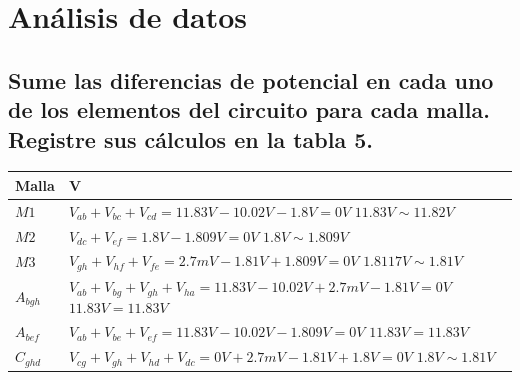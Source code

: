\documentclass[letterpaper, 12pt]{article}
\begin{document}
\section{Análisis de datos}

\subsection{Sume las diferencias de potencial en cada uno de los elementos del circuito para cada
	malla. Registre sus cálculos en la tabla 5.}

\begin{tabularx}{0.9\linewidth}{|>{\centering\arraybackslash}X|>{\centering\arraybackslash}X|}
	\hline

	\textbf{Malla} & \textbf{V}                                                                 \\ \hline
	$M1$           & $V_{ab} + V_{bc} + V_{cd} = 11.83V - 10.02V -1.8V = 0V$
	$11.83V \sim 11.82V$                                                                        \\ \hline

	$M2$           & $V_{dc} + V_{ef} = 1.8V - 1.809V = 0V$
	$1.8V \sim 1.809V$                                                                          \\ \hline

	$M3$           & $V_{gh} + V_{hf} + V_{fe} = 2.7mV - 1.81V + 1.809V = 0V$
	$1.8117V \sim 1.81V$                                                                        \\ \hline

	$A_{bgh}$      & $V_{ab} + V_{bg} + V_{gh} + V_{ha} = 11.83V - 10.02V + 2.7mV - 1.81V = 0V$
	$11.83V = 11.83V$                                                                           \\ \hline

	$A_{bef}$      & $V_{ab} + V_{be} + V_{ef} = 11.83V - 10.02V - 1.809V = 0V$
	$11.83V = 11.83V$                                                                           \\ \hline

	$C_{ghd}$      & $V_{cg} + V_{gh} + V_{hd} + V_{dc} = 0V + 2.7mV - 1.81V + 1.8V = 0V$
	$1.8V \sim 1.81V$                                                                           \\ \hline
\end{tabularx}
\end{document}
